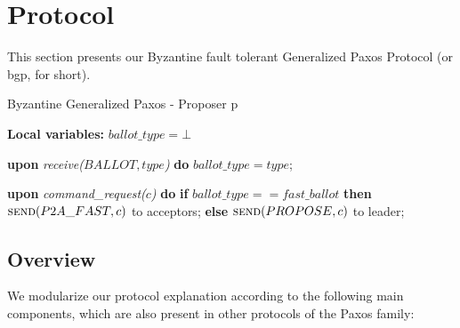 \section{Protocol}

This section presents our Byzantine fault tolerant Generalized Paxos
Protocol (or \acrshort{bgp}, for short). 

\begin{algorithm}
	\caption{Byzantine Generalized Paxos - Proposer p}
	\label{BFT-Prop}
	\textbf{Local variables:} $ballot\_type = \bot$
	\begin{algorithmic}[1]	
		
		\State \textbf{upon} \textit{receive($BALLOT, type$)} \textbf{do} 
		\State \hspace{\algorithmicindent} $ballot\_type = type$;
		\State
		
		\State \textbf{upon} \textit{command\_request($c$)} \textbf{do}   \hspace{\algorithmicindent}\hspace{\algorithmicindent}\hspace{\algorithmicindent}\hspace{\algorithmicindent}
		\State \hspace{\algorithmicindent} \textbf{if} $ballot\_type == fast\_ballot$ \textbf{then}
		\State \hspace{\algorithmicindent}\hspace{\algorithmicindent} $\Call{send}{P2A\_FAST, c}$ to acceptors;
		\State \hspace{\algorithmicindent} \textbf{else} 
		\State \hspace{\algorithmicindent}\hspace{\algorithmicindent} $\Call{send}{PROPOSE, c}$ to leader;		
	\end{algorithmic}
\end{algorithm}

\subsection{Overview}
We modularize our protocol explanation according to the following main components, which are also present in other protocols of the Paxos family:

